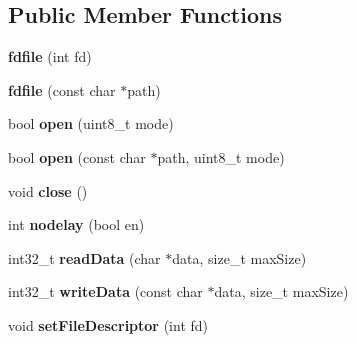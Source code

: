 \subsection*{Public Member Functions}
\begin{DoxyCompactItemize}
\item 
{\bfseries fdfile} (int fd)\hypertarget{classgxx_1_1io_1_1fdfile_acd19f40ea5bddf489b5ba31e7e7e92b6}{}\label{classgxx_1_1io_1_1fdfile_acd19f40ea5bddf489b5ba31e7e7e92b6}

\item 
{\bfseries fdfile} (const char $\ast$path)\hypertarget{classgxx_1_1io_1_1fdfile_a91ed2c96d8b0f11743c757382c03856d}{}\label{classgxx_1_1io_1_1fdfile_a91ed2c96d8b0f11743c757382c03856d}

\item 
bool {\bfseries open} (uint8\+\_\+t mode)\hypertarget{classgxx_1_1io_1_1fdfile_a4136ebc1a0cb06959d77a3a208370499}{}\label{classgxx_1_1io_1_1fdfile_a4136ebc1a0cb06959d77a3a208370499}

\item 
bool {\bfseries open} (const char $\ast$path, uint8\+\_\+t mode)\hypertarget{classgxx_1_1io_1_1fdfile_a4385f6258e930936490b1783409e7064}{}\label{classgxx_1_1io_1_1fdfile_a4385f6258e930936490b1783409e7064}

\item 
void {\bfseries close} ()\hypertarget{classgxx_1_1io_1_1fdfile_a17938c189c1daf14bb540043ee0bb949}{}\label{classgxx_1_1io_1_1fdfile_a17938c189c1daf14bb540043ee0bb949}

\item 
int {\bfseries nodelay} (bool en)\hypertarget{classgxx_1_1io_1_1fdfile_af1f04e5ea0f802ed249e7e70f22e640a}{}\label{classgxx_1_1io_1_1fdfile_af1f04e5ea0f802ed249e7e70f22e640a}

\item 
int32\+\_\+t {\bfseries read\+Data} (char $\ast$data, size\+\_\+t max\+Size)\hypertarget{classgxx_1_1io_1_1fdfile_aab55e428338784966263ce9311c752ea}{}\label{classgxx_1_1io_1_1fdfile_aab55e428338784966263ce9311c752ea}

\item 
int32\+\_\+t {\bfseries write\+Data} (const char $\ast$data, size\+\_\+t max\+Size)\hypertarget{classgxx_1_1io_1_1fdfile_aa6b10070a559b46de324b6a01e7ef7d5}{}\label{classgxx_1_1io_1_1fdfile_aa6b10070a559b46de324b6a01e7ef7d5}

\item 
void {\bfseries set\+File\+Descriptor} (int fd)\hypertarget{classgxx_1_1io_1_1fdfile_a0c30dc106a3dada39e830a2f39a11fed}{}\label{classgxx_1_1io_1_1fdfile_a0c30dc106a3dada39e830a2f39a11fed}


\end{DoxyCompactItemize}
